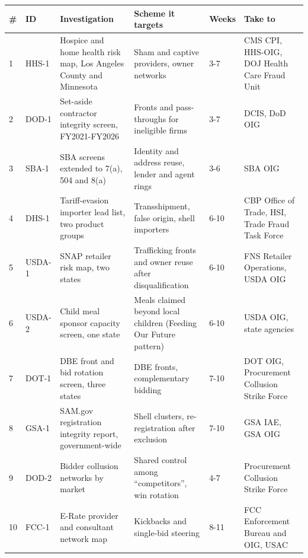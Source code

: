 \documentclass[letterpaper,11pt]{article}
\begin{document}
\begingroup\small\setlength{\tabcolsep}{4pt}\renewcommand{\arraystretch}{1.25}
\begin{longtable}[l]{@{}ll>{\raggedright\arraybackslash}p{}>{\raggedright\arraybackslash}p{}l>{\raggedright\arraybackslash}p{}@{}}
\rowcolor{coolblack}\leavevmode\color{white}\bfseries \# & \leavevmode\color{white}\bfseries ID & \leavevmode\color{white}\bfseries Investigation & \leavevmode\color{white}\bfseries Scheme it targets & \leavevmode\color{white}\bfseries Weeks & \leavevmode\color{white}\bfseries Take to \\
\endhead
1 & HHS-1 & Hospice and home health risk map, Los Angeles County and Minnesota & Sham and captive providers, owner networks & 3-7 & CMS CPI, HHS-OIG, DOJ Health Care Fraud Unit \\
2 & DOD-1 & Set-aside contractor integrity screen, FY2021-FY2026 & Fronts and pass-throughs for ineligible firms & 3-7 & DCIS, DoD OIG \\
3 & SBA-1 & SBA screens extended to 7(a), 504 and 8(a) & Identity and address reuse, lender and agent rings & 3-6 & SBA OIG \\
4 & DHS-1 & Tariff-evasion importer lead list, two product groups & Transshipment, false origin, shell importers & 6-10 & CBP Office of Trade, HSI, Trade Fraud Task Force \\
5 & USDA-1 & SNAP retailer risk map, two states & Trafficking fronts and owner reuse after disqualification & 6-10 & FNS Retailer Operations, USDA OIG \\
6 & USDA-2 & Child meal sponsor capacity screen, one state & Meals claimed beyond local children (Feeding Our Future pattern) & 6-10 & USDA OIG, state agencies \\
7 & DOT-1 & DBE front and bid rotation screen, three states & DBE fronts, complementary bidding & 7-10 & DOT OIG, Procurement Collusion Strike Force \\
8 & GSA-1 & SAM.gov registration integrity report, government-wide & Shell clusters, re-registration after exclusion & 7-10 & GSA IAE, GSA OIG \\
9 & DOD-2 & Bidder collusion networks by market & Shared control among ``competitors'', win rotation & 4-7 & Procurement Collusion Strike Force \\
10 & FCC-1 & E-Rate provider and consultant network map & Kickbacks and single-bid steering & 8-11 & FCC Enforcement Bureau and OIG, USAC \\
\end{longtable}\endgroup
\end{document}

